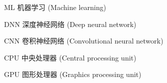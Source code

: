 \begin{denotation}[3cm]
    \item[ML] 机器学习 (Machine learning)
    \item[DNN] 深度神经网络 (Deep neural network)
    \item[CNN] 卷积神经网络 (Convolutional neural network)
    \item[CPU] 中央处理器 (Central processing unit)
    \item[GPU] 图形处理器 (Graphics processing unit)
\end{denotation}
